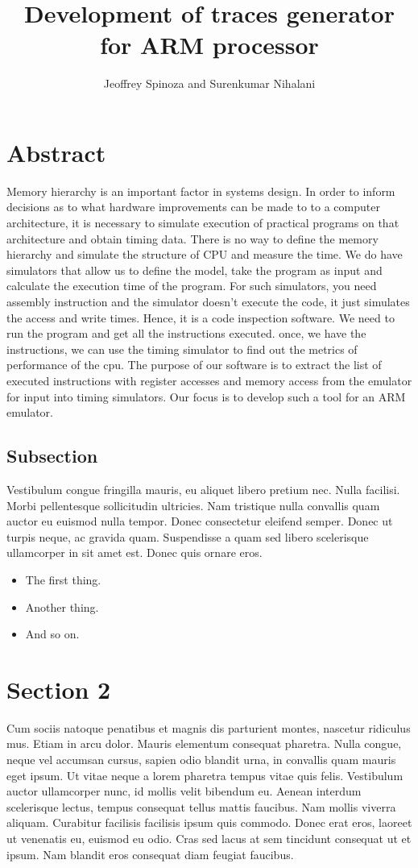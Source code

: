 \documentclass[letterpaper,10pt,twocolumn]{article}
\title{Development of traces generator for ARM processor}
\author{Jeoffrey Spinoza and Surenkumar Nihalani}
\begin{document}
\maketitle


\section{Abstract}
Memory hierarchy is an important factor in systems design. In order to inform decisions as to what hardware improvements can be made to to a computer architecture, it is necessary to simulate execution of practical programs on that architecture and obtain timing data. There is no way to define the memory hierarchy and simulate the structure of CPU and measure the time. We do have simulators that allow us to define the model, take the program as input and calculate the execution time of the program. For such simulators, you need assembly instruction and the simulator doesn't execute the code, it just simulates the access and write times. Hence, it is a code inspection software. We need to run the program and get all the instructions executed. once, we have the instructions, we can use the timing simulator to find out the metrics of performance of the cpu. The purpose of our software is to extract the list of executed instructions with register accesses and memory access from the emulator for input into timing simulators. Our focus is to develop such a tool for an ARM emulator.
\subsection{Subsection}
Vestibulum congue fringilla mauris, eu aliquet libero pretium nec. Nulla facilisi. Morbi pellentesque sollicitudin ultricies. Nam tristique nulla convallis quam auctor eu euismod nulla tempor. Donec consectetur eleifend semper. Donec ut turpis neque, ac gravida quam. Suspendisse a quam sed libero scelerisque ullamcorper in sit amet est. Donec quis ornare eros.

\begin{itemize}
  \item{The first thing.}
  \item{Another thing.}
  \item{And so on.}
\end{itemize}

\section{Section 2}
Cum sociis natoque penatibus et magnis dis parturient montes, nascetur ridiculus mus. Etiam in arcu dolor. Mauris elementum consequat pharetra. Nulla congue, neque vel accumsan cursus, sapien odio blandit urna, in convallis quam mauris eget ipsum. Ut vitae neque a lorem pharetra tempus vitae quis felis. Vestibulum auctor ullamcorper nunc, id mollis velit bibendum eu. Aenean interdum scelerisque lectus, tempus consequat tellus mattis faucibus. Nam mollis viverra aliquam. Curabitur facilisis facilisis ipsum quis commodo. Donec erat eros, laoreet ut venenatis eu, euismod eu odio. Cras sed lacus at sem tincidunt consequat ut et ipsum. Nam blandit eros consequat diam feugiat faucibus.
\end{document}
